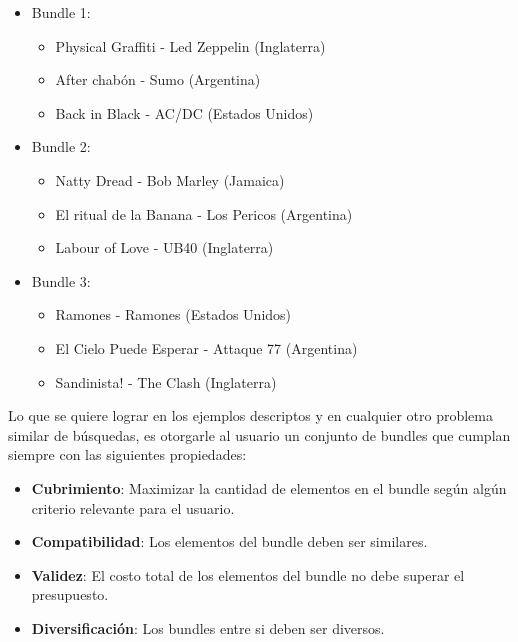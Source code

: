 \begin{itemize}
  \item Bundle 1:
  \begin{itemize}
    \item Physical Graffiti - Led Zeppelin (Inglaterra)
    \item After chabón - Sumo (Argentina)
    \item Back in Black - AC/DC (Estados Unidos)
  \end{itemize}
  \item Bundle 2:
  \begin{itemize}
    \item Natty Dread - Bob Marley (Jamaica)
    \item El ritual de la Banana - Los Pericos (Argentina)
    \item Labour of Love - UB40 (Inglaterra)
  \end{itemize}
	  \item Bundle 3:
  \begin{itemize}
    \item Ramones - Ramones (Estados Unidos)
    \item El Cielo Puede Esperar - Attaque 77 (Argentina)
    \item Sandinista! - The Clash (Inglaterra)
  \end{itemize}
\end{itemize}
Lo que se quiere lograr en los ejemplos descriptos y en cualquier otro problema similar de búsquedas, es otorgarle al usuario un conjunto de bundles que cumplan siempre con las siguientes propiedades: 
\begin{itemize}
  \item \textbf{Cubrimiento}: Maximizar la cantidad de elementos en el bundle según algún criterio relevante para el usuario.
  \item \textbf{Compatibilidad}: Los elementos del bundle deben ser similares.
  \item \textbf{Validez}: El costo total de los elementos del bundle no debe superar el presupuesto.
  \item \textbf{Diversificación}: Los bundles entre si deben ser diversos.
\end{itemize}
